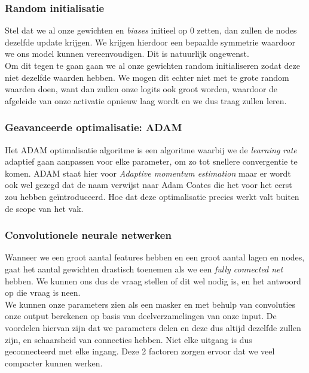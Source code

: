 \subsubsection{Random initialisatie}

Stel dat we al onze gewichten en \textit{biases} initieel op 0 zetten, dan zullen de nodes dezelfde update krijgen. We krijgen hierdoor een bepaalde symmetrie waardoor we ons model kunnen vereenvoudigen. Dit is natuurlijk ongewenst. \\
\newline
Om dit tegen te gaan gaan we al onze gewichten random initialiseren zodat deze niet dezelfde waarden hebben. We mogen dit echter niet met te grote random waarden doen, want dan zullen onze logits ook groot worden, waardoor de afgeleide van onze activatie opnieuw laag wordt en we dus traag zullen leren. 

\subsubsection{Geavanceerde optimalisatie: ADAM}

Het ADAM optimalisatie algoritme is een algoritme waarbij we de \textit{learning rate} adaptief gaan aanpassen voor elke parameter, om zo tot snellere convergentie te komen. ADAM staat hier voor \textit{Adaptive momentum estimation} maar er wordt ook wel gezegd dat de naam verwijst naar Adam Coates die het voor het eerst zou hebben geïntroduceerd. Hoe dat deze optimalisatie precies werkt valt buiten de scope van het vak.

\subsubsection{Convolutionele neurale netwerken}

Wanneer we een groot aantal features hebben en een groot aantal lagen en nodes, gaat het aantal gewichten drastisch toenemen als we een \textit{fully connected net} hebben. We kunnen ons dus de vraag stellen of dit wel nodig is, en het antwoord op die vraag is neen. \\
\newline
We kunnen onze parameters zien als een masker en met behulp van convoluties onze output berekenen op basis van deelverzamelingen van onze input. De voordelen hiervan zijn dat we parameters delen en deze dus altijd dezelfde zullen zijn, en schaarsheid van connecties hebben. Niet elke uitgang is dus geconnecteerd met elke ingang. Deze 2 factoren zorgen ervoor dat we veel compacter kunnen werken. 
